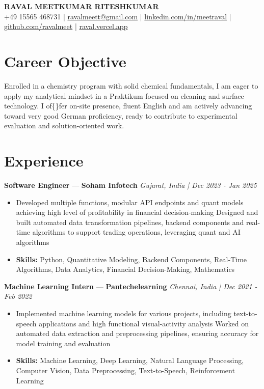 \documentclass[a4paper,10pt]{article}
\begin{document}
\begin{center}
  {\Large\bfseries RAVAL MEETKUMAR RITESHKUMAR}\\[2pt]
  {\small +49 15565 468731 \;|\; \href{mailto:ravalmeett@gmail.com}{ravalmeett@gmail.com} \;|\; \href{https://www.linkedin.com/in/meetraval/}{linkedin.com/in/meetraval} \;|\; \href{https://github.com/ravalmeet}{github.com/ravalmeet} \;|\; \href{https://raval.vercel.app/}{raval.vercel.app}}
\end{center}
\vspace{-3pt}

\section*{Career Objective}
Enrolled in a chemistry program with solid chemical fundamentals, I am eager to apply my analytical mindset in a Praktikum focused on cleaning and surface technology. I of\{\}fer on-site presence, fluent English and am actively advancing toward very good German proficiency, ready to contribute to experimental evaluation and solution-oriented work.\par

\section*{Experience}
\textbf{Software Engineer} — \textbf{Soham Infotech} \hfill \textit{Gujarat, India \;|\; Dec 2023 - Jan 2025}\par
\vspace{1pt}
\begin{itemize}
  \item Developed multiple functions, modular API endpoints and quant models achieving high level of profitability in financial decision-making Designed and built automated data transformation pipelines, backend components and real-time algorithms to support trading operations, leveraging quant and AI algorithms
  \item \textbf{Skills:} Python, Quantitative Modeling, Backend Components, Real-Time Algorithms, Data Analytics, Financial Decision-Making, Mathematics
\end{itemize}
\vspace{3pt}
\textbf{Machine Learning Intern} — \textbf{Pantechelearning} \hfill \textit{Chennai, India \;|\; Dec 2021 - Feb 2022}\par
\vspace{1pt}
\begin{itemize}
  \item Implemented machine learning models for various projects, including text-to-speech applications and high functional visual-activity analysis Worked on automated data extraction and preprocessing pipelines, ensuring accuracy for model training and evaluation
  \item \textbf{Skills:} Machine Learning, Deep Learning, Natural Language Processing, Computer Vision, Data Preprocessing, Text-to-Speech, Reinforcement Learning
\end{itemize}
\end{document}
